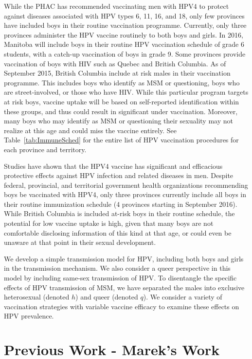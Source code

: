 \documentclass[12pt]{article}
\begin{document}
While the PHAC has recommended vaccinating men with HPV4 to protect against diseases associated with HPV types 6, 11, 16, and 18, only few provinces have included boys in their routine vaccination programme.  Currently, only three provinces administer the HPV vaccine routinely to both boys and girls.  In 2016, Manitoba will include boys in their routine HPV vaccination schedule of grade 6 students, with a catch-up vaccination of boys in grade 9.  Some provinces provide vaccination of boys with HIV such as Quebec and British Columbia.  As of September 2015, British Columbia include at risk males in their vaccination programme.  This includes boys who identify as MSM or questioning, boys who are street-involved, or those who have HIV. While this particular program targets at risk boys, vaccine uptake will be based on self-reported identification within these groups, and thus could result in significant under vaccination.  Moreover, many boys who may identify as MSM or questioning their sexuality may not realize at this age and could miss the vaccine entirely.  See Table~\ref{tab:ImmuneSched} for the entire list of HPV vaccination procedures for each province and territory.  

Studies have shown that the HPV4 vaccine has significant and efficacious protective effects against HPV infection and related diseases in men.  Despite federal, provincial, and territorial government health organizations recommending boys be vaccinated with HPV4, only three provinces currently include all boys in their routine immunization schedule (4 provinces starting in September 2016).  While British Columbia is included at-risk boys in their routine schedule, the potential for low vaccine uptake is high, given that many boys are not comfortable disclosing information of this kind at that age, or could even be unaware at that point in their sexual development.  

We develop a simple transmission model for HPV, including both boys and girls in the transmission mechanism.  We also consider a queer perspective in this model by including same-sex transmission of HPV.  To disentangle the specific effects of HPV transmission of MSM, we have separated the males into exclusive heterosexual (denoted $h$) and queer (denoted $q$).  We consider a variety of vaccination strategies with variable vaccine efficacy to examine these effects on HPV prevalence.  
\section*{Previous Work - Marek's Work}
\end{document}
